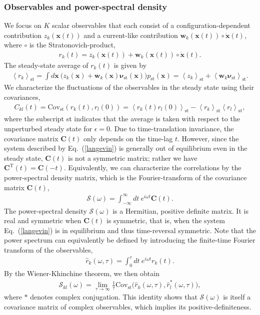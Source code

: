 \documentclass[aps,pre,twocolumn,superscriptaddress,notitlepage]{revtex4-2}
\newcommand{\Av}[1]{\left\langle #1 \right\rangle}
\newcommand{\bmc}[1]{\bm{\mathcal{#1}}}
\renewcommand{\eqref}[1]{Eq.~(\ref{#1})}
\begin{document}
\subsubsection{Observables and power-spectral density}
We focus on $K$ scalar observables that each consist of a configuration-dependent contribution $z_k(\bm{x}(t))$ and a current-like contribution $\bm{w}_k(\bm{x}(t)) \circ \dot{\bm{x}}(t)$, where $\circ$ is the Stratonovich-product,
\begin{align}
r_k(t) = z_k(\bm{x}(t)) + \bm{w}_k(\bm{x}(t)) \circ \dot{\bm{x}}(t) \label{observable} .
\end{align}
The steady-state average of $r_k(t)$ is given by
\begin{align}
\Av{r_k}_\text{st} = \int d\bm{x} \ \Big( z_k(\bm{x}) + \bm{w}_k(\bm{x}) \bm{\nu}_\text{st}(\bm{x}) \Big) p_\text{st}(\bm{x}) =  \Av{z_k}_\text{st} + \Av{\bm{w}_k \bm{\nu}_\text{st}}_\text{st} .
\end{align}
We characterize the fluctuations of the observables in the steady state using their covariances,
\begin{align}
C_{kl}(t) = \text{Cov}_\text{st}(r_k(t),r_l(0)) = \Av{r_k(t) r_l(0)}_\text{st} - \Av{r_k}_\text{st} \Av{r_l}_\text{st} ,
\end{align}
where the subscript st indicates that the average is taken with respect to the unperturbed steady state for $\epsilon = 0$.
Due to time-translation invariance, the covariance matrix $\bm{C}(t)$ only depends on the time-lag $t$.
However, since the system described by \eqref{langevin} is generally out of equilibrium even in the steady state, $\bm{C}(t)$ is not a symmetric matrix; rather we have $\bm{C}^\text{T}(t) = \bm{C}(-t)$.
Equivalently, we can characterize the correlations by the power-spectral density matrix, which is the Fourier-transform of the covariance matrix $\bm{C}(t)$,
\begin{align}
\bmc{S}(\omega) = \int_{-\infty}^\infty dt \ e^{i \omega t} \bm{C}(t) \label{power-spectral-density} .
\end{align}
The power-spectral density $\bmc{S}(\omega)$ is a Hermitian, positive definite matrix.
It is real and symmetric when $\bm{C}(t)$ is symmetric, that is, when the system \eqref{langevin} is in equilibrium and thus time-reversal symmetric.
Note that the power spectrum can equivalently be defined by introducing the finite-time Fourier transform of the observables,
\begin{align}
\hat{r}_k(\omega,\tau) = \int_0^\tau dt \ e^{i \omega t} r_k(t).
\end{align}
By the Wiener-Khinchine theorem, we then obtain
\begin{align}
\mathcal{S}_{kl}(\omega) = \lim_{\tau \rightarrow \infty} \frac{1}{\tau} \text{Cov}_\text{st}\big(\hat{r}_k(\omega,\tau),\hat{r}_l^*(\omega,\tau) \big),
\end{align}
where $*$ denotes complex conjugation.
This identity shows that $\bmc{S}(\omega)$ is itself a covariance matrix of complex observables, which implies its positive-definiteness.
\end{document}
